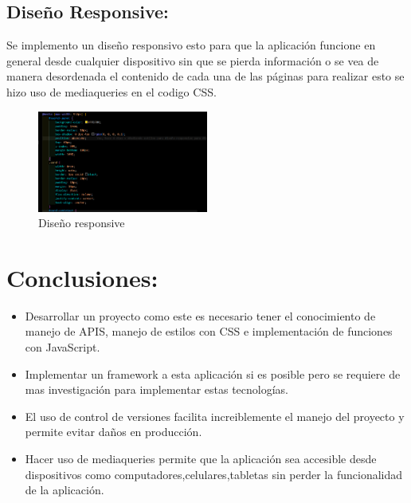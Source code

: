\documentclass[12pt]{article}
\begin{document}
        \subsection{Diseño Responsive: }
        Se implemento un diseño responsivo esto para que la aplicación funcione en general desde cualquier dispositivo sin que se pierda información o se vea de manera desordenada el contenido de cada una de las páginas para realizar esto se hizo uso de mediaqueries en el codigo CSS.

        \begin{figure}[h]
            \centering
            \includegraphics[width=0.5\textwidth]{img/media.png}
            \caption{Diseño responsive}
            \label{figure:responsive}
        \end{figure}
    \section{Conclusiones:}
    \begin{itemize}
        \item Desarrollar un proyecto como este es necesario tener el conocimiento de manejo de APIS, manejo de estilos con CSS e implementación de funciones con JavaScript.
        \item Implementar un framework a esta aplicación si es posible pero se requiere de mas investigación para implementar estas tecnologías.
        \item El uso de control de versiones facilita increiblemente el manejo del proyecto y permite evitar daños en producción.
        \item Hacer uso de mediaqueries permite que la aplicación sea accesible desde dispositivos como computadores,celulares,tabletas sin perder la funcionalidad de la aplicación.
    \end{itemize}
    \vspace{5cm}
\end{document}
